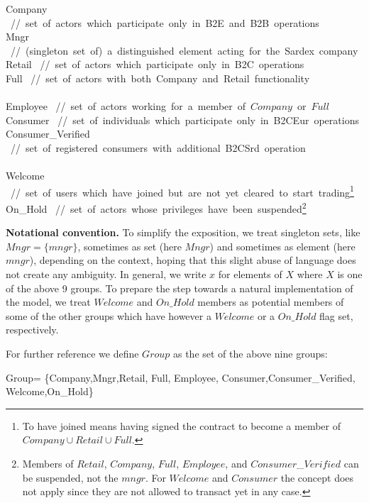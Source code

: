 \begin{asm}
Company \mbox{  // set of actors which participate only in B2E and B2B operations}\\
Mngr 
  \mbox{  // (singleton set of) a distinguished element 
  	acting for the Sardex company}\\
Retail \mbox{  // set of actors which participate only in B2C operations}\\
Full \mbox{  // set of actors with both Company and Retail functionality}\\ 
\\
Employee \mbox{  // set of actors working for a member of $Company$ or $Full$}\\
Consumer \mbox{  // set of individuals which participate only in B2CEur operations} \\
Consumer\_Verified \mbox{  // set of registered consumers with additional B2CSrd operation} \\ 
\\
Welcome \mbox{  // set of users which have joined but are not yet cleared to start trading}\footnote{To have joined means having signed the contract to become a member of $Company \cup Retail \cup Full$.}\\
On\_Hold \mbox{  // set of actors whose privileges have been suspended}\footnote{Members of $Retail$, $Company$, $Full$, $Employee$, and $Consumer$\_$Verified$ can be suspended, not the $mngr$. For $Welcome$ and $Consumer$ the concept does not apply since they are not allowed to transact yet in any case.}
\end{asm}


{\bf Notational convention.} To simplify the exposition, we treat singleton sets, like $Mngr=\{mngr\}$, sometimes as set (here $Mngr$) and sometimes as element (here $mngr$), depending on the context, hoping that this slight abuse of language does not create any ambiguity. 
In general, we write $x$ for elements of $X$ where $X$ is one of the above 9 groups. To prepare the step towards a natural implementation of the model, we treat $Welcome$ and $On\_Hold$ members as potential members of some of the other groups which have however a $Welcome$ or a $On\_Hold$ flag set, respectively.

For further reference we define $Group$ as the set of the above nine groups:
\begin{asm}
Group= \+
       \{Company,Mngr,Retail, Full, Employee,\+
             Consumer,Consumer\_Verified, Welcome,On\_Hold\}
\end{asm}

